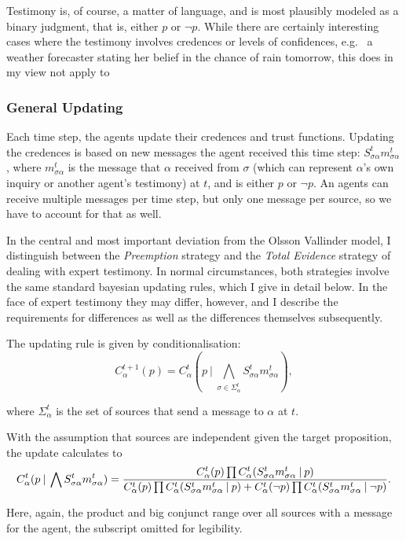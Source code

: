 \documentclass[11pt, a4paper]{scrartcl}
\newcommand{\Stsa}{S^t_{\sigma\alpha}}
\newcommand{\sa}{{\sigma\alpha}}
\newcommand{\given}[1][]{\:#1\vert\:}
\newcommand{\Sm}{\Stsa{}m^t_{\sa}}
\renewcommand{\i}[1]{\emph{#1}}
\renewcommand{\a}{\alpha}
\begin{document}
Testimony is, of course, a matter of language, and is most plausibly modeled as a binary judgment, that is, either $p$ or $\neg p$. While there are certainly interesting cases where the testimony involves credences or levels of confidences, e.g. \ a weather forecaster stating her belief in the chance of rain tomorrow, this does in my view not apply to  

\subsubsection{General Updating}

Each time step, the agents update their credences and trust functions. Updating the credences is based on new messages the agent received this time step: $\Stsa m^t_{\sa}$, where $m^t_{\sa}$ is the message that $\alpha$ received from $\sigma$ (which can represent $\alpha$'s own inquiry or another agent's testimony) at $t$, and is either $p$ or $\neg p$. An agents can receive multiple messages per time step, but only one message per source, so we have to account for that as well. 

In the central and most important deviation from the Olsson Vallinder model, I distinguish between the \i{Preemption} strategy and the \i{Total Evidence} strategy of dealing with expert testimony. In normal circumstances, both strategies involve the same standard bayesian updating rules, which I give in detail below. In the face of expert testimony they may differ, however, and I describe the requirements for differences as well as the differences themselves subsequently. 

The updating rule is given by conditionalisation:
\[
    C^{t+1}_\alpha (p) = C^t_\alpha (p \given \bigwedge_{\sigma \in \Sigma^t_\alpha} \Stsa m^t_{\sa}),
\]

where $\Sigma^t_\alpha$ is the set of sources that send a message to $\alpha$ at $t$.

With the assumption that sources are independent given the target proposition, the update calculates to
\begin{equation}
    \label{eq:upd}
    C^t_\a (p \given \bigwedge \Sm) = \\
     \frac{C^t_\a (p) \prod C^t_\a (\Sm \given p) }
    {C^t_\a (p) \prod C^t_\a (\Sm \given p) +  C^t_\a (\neg p) \prod C^t_\a (\Sm \given \neg p) }.
\end{equation}

Here, again, the product and big conjunct range over all sources with a message for the agent, the subscript omitted for legibility.   
\end{document}
